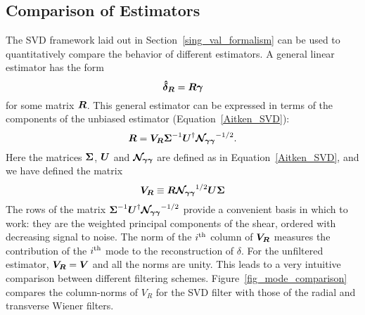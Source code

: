 \subsection{Comparison of Estimators}
\label{Comparison}

The SVD framework laid out in Section~\ref{sing_val_formalism} can be used
to quantitatively compare the behavior of different estimators.  A general
linear estimator has the form
\begin{equation}
  \boldsymbol{\hat\delta_R} = \boldsymbol{R}\boldsymbol{\gamma}
\end{equation}
for some matrix $\boldsymbol{R}$.
This general estimator can be expressed in terms of the components of
the unbiased estimator (Equation~\ref{Aitken_SVD}):
\begin{equation}
  \boldsymbol{R} = \boldsymbol{V_R} \boldsymbol{\Sigma}^{-1} 
  \boldsymbol{U}^\dagger \boldsymbol{\mathcal{N}_{\gamma\gamma}}^{-1/2}.
\end{equation}
Here the matrices $\boldsymbol{\Sigma}$, $\boldsymbol{U}$ and 
$\boldsymbol{\mathcal{N}_{\gamma\gamma}}$ are defined as in 
Equation~\ref{Aitken_SVD}, and we have defined the matrix
\begin{equation}
  \boldsymbol{V_R} \equiv \boldsymbol{R}\boldsymbol{\mathcal{N}_{\gamma\gamma}}^{1/2}
  \boldsymbol{U}\boldsymbol{\Sigma}
\end{equation}
The rows of the matrix $\boldsymbol{\Sigma}^{-1} \boldsymbol{U}^\dagger 
\boldsymbol{\mathcal{N}_{\gamma\gamma}}^{-1/2}$ provide a convenient basis
in which to work: they are the weighted principal components of the shear, 
ordered with decreasing signal to noise.  The norm of
the $i^{\rm th}$ column of $\boldsymbol{V_R}$ measures the contribution of
the $i^{\rm th}$ mode to the reconstruction of $\delta$.  For the unfiltered
estimator, $\boldsymbol{V_R}=\boldsymbol{V}$ and all the norms are unity.
This leads to a very intuitive comparison between different filtering schemes.
Figure~\ref{fig_mode_comparison} compares the column-norms of $V_R$ 
for the SVD filter with those of the radial and
transverse Wiener filters.
  
